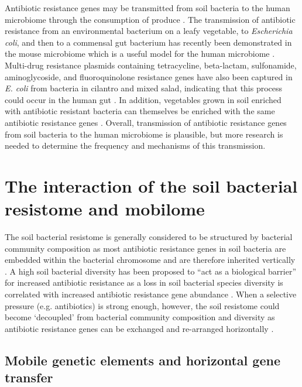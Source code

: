 Antibiotic resistance genes may be transmitted from soil bacteria to the human microbiome through the consumption of produce \parencite{Maeusli.2020, Blau.2018}.
The transmission of antibiotic resistance from an environmental bacterium on a leafy vegetable, to \textit{Escherichia coli}, and then to a commensal gut bacterium has recently been demonstrated in the mouse microbiome which is a useful model for the human microbiome \parencite{Maeusli.2020, Krych.2013}.
Multi-drug resistance plasmids containing tetracycline, beta-lactam, sulfonamide, aminoglycoside, and fluoroquinolone resistance genes have also been captured in \textit{E. coli} from bacteria in cilantro and mixed salad, indicating that this process could occur in the human gut \parencite{Blau.2018}.
In addition, vegetables grown in soil enriched with antibiotic resistant bacteria can themselves be enriched with the same antibiotic resistance genes \parencite{Murray.2019, Rahube.2016, Rahube.2014}.
Overall, transmission of antibiotic resistance genes from soil bacteria to the human microbiome is plausible, but more research is needed to determine the frequency and mechanisms of this transmission.

\section{The interaction of the soil bacterial resistome and mobilome}

The soil bacterial resistome is generally considered to be structured by bacterial community composition as most antibiotic resistance genes in soil bacteria are embedded within the bacterial chromosome and are therefore inherited vertically \parencite{Dunivin.2019, Forsberg.2014}.
A high soil bacterial diversity has been proposed to “act as a biological barrier” for increased antibiotic resistance as a loss in soil bacterial species diversity is correlated with increased antibiotic resistance gene abundance \parencite{vanGoethem.2018, Chen.2019c, Vivant.2013}.
When a selective pressure (e.g. antibiotics) is strong enough, however, the soil resistome could become ‘decoupled’ from bacterial community composition and diversity as antibiotic resistance genes can be exchanged and re-arranged horizontally \parencite{Johnson.2016}.

\subsection{Mobile genetic elements and horizontal gene transfer}

